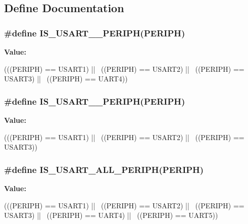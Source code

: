 \subsection{Define Documentation}
\hypertarget{group__USART__Exported__Constants_ga9b6af380cae2290d0653bd555deaeda1}{
\subsubsection[{IS\_\-USART\_\-1234\_\-PERIPH}]{\setlength{\rightskip}{0pt plus 5cm}\#define IS\_\-USART\_\_\-PERIPH(PERIPH)}}
\label{group__USART__Exported__Constants_ga9b6af380cae2290d0653bd555deaeda1}
{\bfseries Value:}
\begin{DoxyCode}
(((PERIPH) == USART1) || \
                                      ((PERIPH) == USART2) || \
                                      ((PERIPH) == USART3) || \
                                      ((PERIPH) == UART4))
\end{DoxyCode}
\hypertarget{group__USART__Exported__Constants_ga30e128c5edde23e1315724c0b2000d0d}{
\subsubsection[{IS\_\-USART\_\_\-PERIPH}]{\setlength{\rightskip}{0pt plus 5cm}\#define IS\_\-USART\_\-123\_\-PERIPH(PERIPH)}}
\label{group__USART__Exported__Constants_ga30e128c5edde23e1315724c0b2000d0d}
{\bfseries Value:}
\begin{DoxyCode}
(((PERIPH) == USART1) || \
                                     ((PERIPH) == USART2) || \
                                     ((PERIPH) == USART3))
\end{DoxyCode}
\hypertarget{group__USART__Exported__Constants_gae890b8e77c1b84a77c485a353949f7eb}{
\subsubsection[{IS\_\-USART\_\-ALL\_\-PERIPH}]{\setlength{\rightskip}{0pt plus 5cm}\#define IS\_\-USART\_\-ALL\_\-PERIPH(PERIPH)}}
\label{group__USART__Exported__Constants_gae890b8e77c1b84a77c485a353949f7eb}
{\bfseries Value:}
\begin{DoxyCode}
(((PERIPH) == USART1) || \
                                     ((PERIPH) == USART2) || \
                                     ((PERIPH) == USART3) || \
                                     ((PERIPH) == UART4) || \
                                     ((PERIPH) == UART5))
\end{DoxyCode}
